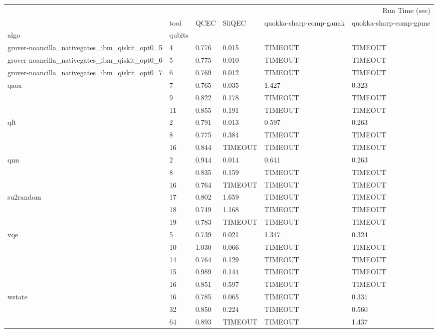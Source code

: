 \begin{tabular}{llllll}
\toprule
 &  & \multicolumn{4}{r}{Run Time (sec)} \\
 & tool & QCEC & SliQEC & quokka-sharp-comp-ganak & quokka-sharp-comp-gpmc \\
algo & qubits &  &  &  &  \\
\midrule
grover-noancilla_nativegates_ibm_qiskit_opt0_5 & 4 & 0.776 & 0.015 & TIMEOUT & TIMEOUT \\
\cline{1-6}
grover-noancilla_nativegates_ibm_qiskit_opt0_6 & 5 & 0.775 & 0.010 & TIMEOUT & TIMEOUT \\
\cline{1-6}
grover-noancilla_nativegates_ibm_qiskit_opt0_7 & 6 & 0.769 & 0.012 & TIMEOUT & TIMEOUT \\
\cline{1-6}
\multirow[t]{3}{*}{qaoa} & 7 & 0.765 & 0.035 & 1.427 & 0.323 \\
 & 9 & 0.822 & 0.178 & TIMEOUT & TIMEOUT \\
 & 11 & 0.855 & 0.191 & TIMEOUT & TIMEOUT \\
\cline{1-6}
\multirow[t]{3}{*}{qft} & 2 & 0.791 & 0.013 & 0.597 & 0.263 \\
 & 8 & 0.775 & 0.384 & TIMEOUT & TIMEOUT \\
 & 16 & 0.844 & TIMEOUT & TIMEOUT & TIMEOUT \\
\cline{1-6}
\multirow[t]{3}{*}{qnn} & 2 & 0.944 & 0.014 & 0.641 & 0.263 \\
 & 8 & 0.835 & 0.159 & TIMEOUT & TIMEOUT \\
 & 16 & 0.764 & TIMEOUT & TIMEOUT & TIMEOUT \\
\cline{1-6}
\multirow[t]{3}{*}{su2random} & 17 & 0.802 & 1.659 & TIMEOUT & TIMEOUT \\
 & 18 & 0.749 & 1.168 & TIMEOUT & TIMEOUT \\
 & 19 & 0.783 & TIMEOUT & TIMEOUT & TIMEOUT \\
\cline{1-6}
\multirow[t]{5}{*}{vqe} & 5 & 0.739 & 0.021 & 1.347 & 0.324 \\
 & 10 & 1.030 & 0.066 & TIMEOUT & TIMEOUT \\
 & 14 & 0.764 & 0.129 & TIMEOUT & TIMEOUT \\
 & 15 & 0.989 & 0.144 & TIMEOUT & TIMEOUT \\
 & 16 & 0.851 & 0.597 & TIMEOUT & TIMEOUT \\
\cline{1-6}
\multirow[t]{3}{*}{wstate} & 16 & 0.785 & 0.065 & TIMEOUT & 0.331 \\
 & 32 & 0.850 & 0.224 & TIMEOUT & 0.560 \\
 & 64 & 0.893 & TIMEOUT & TIMEOUT & 1.437 \\
\cline{1-6}
\bottomrule
\end{tabular}
